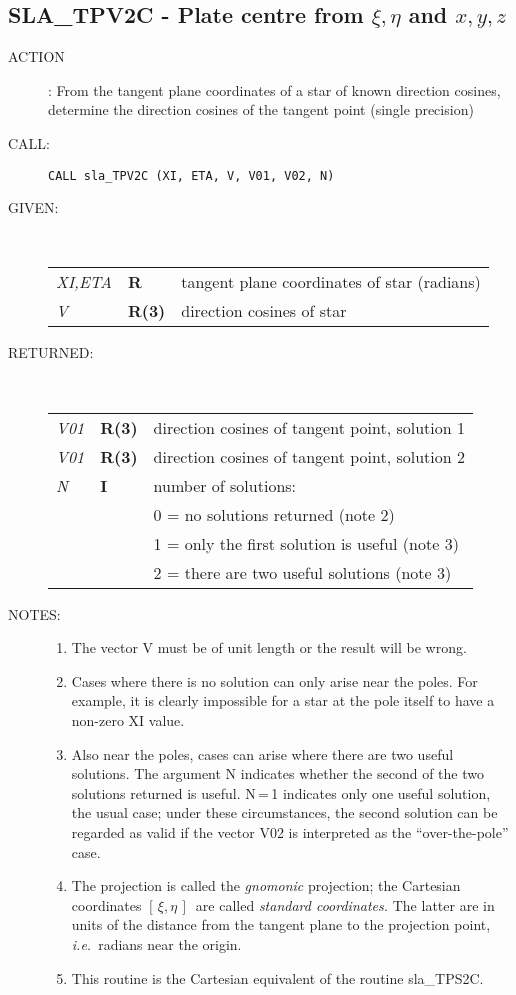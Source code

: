 \documentclass[11pt,twoside]{article}
\newcommand{\xlabel}[1]{}
\newcommand{\xieta}     {$[\,\xi,\eta\,]$}
\newcommand{\routine}[3]
{\hbadness=10000
  \vbox
  {
    \rule{\textwidth}{0.3mm}\\
    {\Large {\bf #1} \hfill #2 \hfill {\bf #1}}\\
    \setlength{\oldspacing}{\topsep}
    \setlength{\topsep}{0.3ex}
    \begin{description}
      #3
    \end{description}
    \setlength{\topsep}{\oldspacing}
  }
}
\renewcommand{\routine}[3]
   {
      \subsection{#1\xlabel{#1} - #2\label{#1}}
       \begin{description}
         #3
       \end{description}
   }
\newcommand{\action}[1]
{\item[ACTION]: #1}
\newcommand{\action}[1]
   {\item[ACTION:] #1}
\newcommand{\call}[1]
{\item[CALL]: \hspace{0.4em}{\tt #1}}
\newlength{\oldspacing}
\renewcommand{\call}[1]
   {
    \item[CALL:] {\tt #1}
   }
\newcommand{\args}[2]
{
  \goodbreak
  \setlength{\oldspacing}{\topsep}
  \setlength{\topsep}{0.3ex}
  \begin{description}
  \item[#1]:\\[1.5ex]
    \begin{tabular}{p{7em}p{6em}p{22em}}
      #2
    \end{tabular}
  \end{description}
  \setlength{\topsep}{\oldspacing}
}
\renewcommand{\args}[2]
   {
     \begin{description}
        \item[#1:]\\
        \begin{tabular}{p{7em}p{6em}l}
           #2
        \end{tabular}
     \end{description}
   }
\newcommand{\spec}[3]
{
  {\em {#1}} & {\bf \mbox{#2}} & {#3}
}
\newcommand{\notes}[1]
{
  \goodbreak
  \setlength{\oldspacing}{\topsep}
  \setlength{\topsep}{0.3ex}
  \begin{description}
    \item[NOTES]:
        #1
  \end{description}
  \setlength{\topsep}{\oldspacing}
}
\renewcommand{\notes}[1]
   {
      \begin{description}
         \item[NOTES:]
            #1
      \end{description}
   }
\begin{document}
\routine{SLA\_TPV2C}{Plate centre from $\xi,\eta$ and $x,y,z$}
{
 \action{From the tangent plane coordinates of a star of known
         direction cosines, determine the direction cosines
         of the tangent point (single precision)}
 \call{CALL sla\_TPV2C (XI, ETA, V, V01, V02, N)}
}
\args{GIVEN}
{
 \spec{XI,ETA}{R}{tangent plane coordinates of star (radians)} \\
 \spec{V}{R(3)}{direction cosines of star}
}
\args{RETURNED}
{
 \spec{V01}{R(3)}{direction cosines of tangent point, solution 1} \\
 \spec{V01}{R(3)}{direction cosines of tangent point, solution 2} \\
 \spec{N}{I}{number of solutions:} \\
 \spec{}{}{\hspace{1em} 0 = no solutions returned  (note 2)} \\
 \spec{}{}{\hspace{1em} 1 = only the first solution is useful (note 3)} \\
 \spec{}{}{\hspace{1em} 2 = there are two useful solutions (note 3)}
}
\notes
{
 \begin{enumerate}
  \item The vector V must be of unit length or the result will be wrong.
  \item Cases where there is no solution can only arise near the poles.
        For example, it is clearly impossible for a star at the pole
        itself to have a non-zero XI value.
  \item Also near the poles, cases can arise where there are two useful
        solutions.  The argument N indicates whether the second of the
        two solutions returned is useful.
        N\,=\,1
        indicates only one useful solution, the usual case;  under these
        circumstances, the second solution can be regarded as valid if
        the vector V02 is interpreted as the ``over-the-pole'' case.
  \item The projection is called the {\it gnomonic}\/ projection;  the
        Cartesian coordinates \xieta\ are called
        {\it standard coordinates.}\/  The latter
        are in units of the distance from the tangent plane to the projection
        point, {\it i.e.}\ radians near the origin.
  \item This routine is the Cartesian equivalent of the routine sla\_TPS2C.
 \end{enumerate}
}
\end{document}

